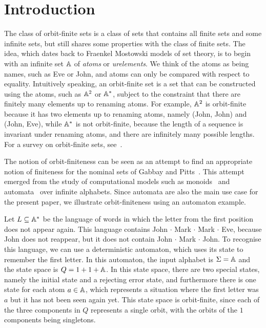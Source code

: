 \section{Introduction}
The class of orbit-finite sets is a class of sets that contains all finite sets and some infinite sets, but still shares some properties with the class of finite sets.  The idea, which dates back to Fraenkel Mostowski models of set theory,  is to begin with an infinite set $\mathbb A$ of \emph{atoms} or \emph{urelements}. We think of the atoms as being names, such as Eve or John, and atoms can only be compared with respect to equality. Intuitively speaking, an  orbit-finite set is a set  that can be constructed using the atoms, such as $\mathbb A^2$ or $\mathbb A^*$, subject to the constraint that there are finitely many elements up to  renaming atoms. For example, $\mathbb A^2$ is orbit-finite because it has two elements up to renaming atoms, namely (John, John) and (John, Eve), while $\mathbb A^*$ is not orbit-finite, because the length of a sequence is invariant under renaming atoms, and there are infinitely many possible lengths. For a survey on orbit-finite sets, see~\cite{bojanczyk_slightly2018}.

The notion of orbit-finiteness can be seen as an attempt to find an appropriate notion of finiteness for the  nominal sets of Gabbay and Pitts~\cite{PittsAM:nomsns}.  This attempt emerged from the study of computational models such as monoids~\cite{bojanczykNominalMonoids2013} and automata~\cite{bojanczykAutomataTheoryNominal2014} over infinite alphabets. Since automata are also the main use case for the present paper, we illustrate orbit-finiteness using an automaton example. 

\begin{example}\label{ex:first-letter-repeats}
    Let  $L \subseteq \mathbb A^*$ be the language of  words in which the letter from the first position does not appear again. This language contains John $\cdot$ Mark $\cdot$ Mark $\cdot$ Eve, because John does not reappear, but it does not contain John $\cdot$ Mark $\cdot$ John. To recognise this language, we can use a deterministic automaton, which uses its state to remember the first letter. In this automaton, the input alphabet is $\Sigma = \mathbb A$ and  the state space is $Q = 1 + 1 + \mathbb A$. In this state space, there are two special states, namely the initial state and a rejecting error state, and furthermore there is one state for each atom $a \in \mathbb A$, which represents a situation where the first letter was $a$ but it has not been seen again yet. This state space is orbit-finite, since each of the three components in $Q$ represents a single orbit, with the orbits of the $1$ components being singletons.
\end{example}

